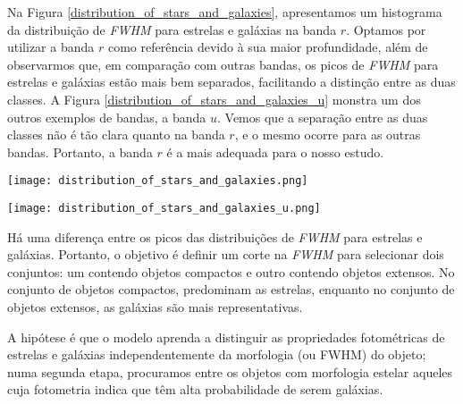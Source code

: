 Na Figura \ref{distribution_of_stars_and_galaxies}, apresentamos um histograma da distribuição de \textit{FWHM} para estrelas e galáxias na banda $r$. Optamos por utilizar a banda $r$ como referência devido à sua maior profundidade, além de observarmos que, em comparação com outras bandas, os picos de \textit{FWHM} para estrelas e galáxias estão mais bem separados, facilitando a distinção entre as duas classes. A Figura \ref{distribution_of_stars_and_galaxies_u} monstra um dos outros exemplos de bandas, a banda $u$. Vemos que a separação entre as duas classes não é tão clara quanto na banda $r$, e o mesmo ocorre para as outras bandas. Portanto, a banda $r$ é a mais adequada para o nosso estudo. 


\begin{center}
    \begin{minipage}{0.45\textwidth}
        \centering
        \texttt{[image: distribution\_of\_stars\_and\_galaxies.png]}
        \captionsetup{}
        \label{distribution_of_stars_and_galaxies}
    \end{minipage}
    \hfill
    \begin{minipage}{0.45\textwidth}
        \centering
        \texttt{[image: distribution\_of\_stars\_and\_galaxies\_u.png]}
        \captionsetup{}
        \label{distribution_of_stars_and_galaxies_u}
    \end{minipage}
\end{center}

Há uma diferença entre os picos das distribuições de \textit{FWHM} para estrelas e galáxias. Portanto, o objetivo é definir um corte na \textit{FWHM} para selecionar dois conjuntos: um contendo objetos compactos e outro contendo objetos extensos. No conjunto de objetos compactos, predominam as estrelas, enquanto no conjunto de objetos extensos, as galáxias são mais representativas.

A hipótese é que o modelo aprenda a distinguir as propriedades fotométricas de estrelas e galáxias independentemente da morfologia (ou FWHM) do objeto; numa segunda etapa, procuramos entre os objetos com morfologia estelar aqueles cuja fotometria indica que têm alta probabilidade de serem galáxias.

